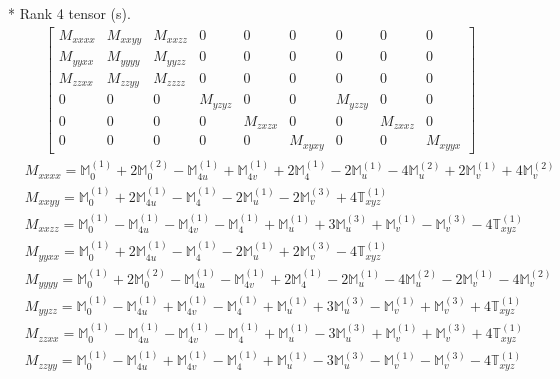 \documentclass[fleqn,8pt,landscape]{jsarticle}
\begin{document}
* Rank 4 tensor (s).
\begin{align*}
\begin{bmatrix} M_{xxxx} & M_{xxyy} & M_{xxzz} & 0 & 0 & 0 & 0 & 0 & 0 \\ M_{yyxx} & M_{yyyy} & M_{yyzz} & 0 & 0 & 0 & 0 & 0 & 0 \\ M_{zzxx} & M_{zzyy} & M_{zzzz} & 0 & 0 & 0 & 0 & 0 & 0 \\ 0 & 0 & 0 & M_{yzyz} & 0 & 0 & M_{yzzy} & 0 & 0 \\ 0 & 0 & 0 & 0 & M_{zxzx} & 0 & 0 & M_{zxxz} & 0 \\ 0 & 0 & 0 & 0 & 0 & M_{xyxy} & 0 & 0 & M_{xyyx} \end{bmatrix}
\end{align*}
\begin{align*}
& M_{xxxx} = \mathbb{M}_{0}^{(1)} + 2 \mathbb{M}_{0}^{(2)} - \mathbb{M}_{4u}^{(1)} + \mathbb{M}_{4v}^{(1)} + 2 \mathbb{M}_{4}^{(1)} - 2 \mathbb{M}_{u}^{(1)} - 4 \mathbb{M}_{u}^{(2)} + 2 \mathbb{M}_{v}^{(1)} + 4 \mathbb{M}_{v}^{(2)} \\
& M_{xxyy} = \mathbb{M}_{0}^{(1)} + 2 \mathbb{M}_{4u}^{(1)} - \mathbb{M}_{4}^{(1)} - 2 \mathbb{M}_{u}^{(1)} - 2 \mathbb{M}_{v}^{(3)} + 4 \mathbb{T}_{xyz}^{(1)} \\
& M_{xxzz} = \mathbb{M}_{0}^{(1)} - \mathbb{M}_{4u}^{(1)} - \mathbb{M}_{4v}^{(1)} - \mathbb{M}_{4}^{(1)} + \mathbb{M}_{u}^{(1)} + 3 \mathbb{M}_{u}^{(3)} + \mathbb{M}_{v}^{(1)} - \mathbb{M}_{v}^{(3)} - 4 \mathbb{T}_{xyz}^{(1)} \\
& M_{yyxx} = \mathbb{M}_{0}^{(1)} + 2 \mathbb{M}_{4u}^{(1)} - \mathbb{M}_{4}^{(1)} - 2 \mathbb{M}_{u}^{(1)} + 2 \mathbb{M}_{v}^{(3)} - 4 \mathbb{T}_{xyz}^{(1)} \\
& M_{yyyy} = \mathbb{M}_{0}^{(1)} + 2 \mathbb{M}_{0}^{(2)} - \mathbb{M}_{4u}^{(1)} - \mathbb{M}_{4v}^{(1)} + 2 \mathbb{M}_{4}^{(1)} - 2 \mathbb{M}_{u}^{(1)} - 4 \mathbb{M}_{u}^{(2)} - 2 \mathbb{M}_{v}^{(1)} - 4 \mathbb{M}_{v}^{(2)} \\
& M_{yyzz} = \mathbb{M}_{0}^{(1)} - \mathbb{M}_{4u}^{(1)} + \mathbb{M}_{4v}^{(1)} - \mathbb{M}_{4}^{(1)} + \mathbb{M}_{u}^{(1)} + 3 \mathbb{M}_{u}^{(3)} - \mathbb{M}_{v}^{(1)} + \mathbb{M}_{v}^{(3)} + 4 \mathbb{T}_{xyz}^{(1)} \\
& M_{zzxx} = \mathbb{M}_{0}^{(1)} - \mathbb{M}_{4u}^{(1)} - \mathbb{M}_{4v}^{(1)} - \mathbb{M}_{4}^{(1)} + \mathbb{M}_{u}^{(1)} - 3 \mathbb{M}_{u}^{(3)} + \mathbb{M}_{v}^{(1)} + \mathbb{M}_{v}^{(3)} + 4 \mathbb{T}_{xyz}^{(1)} \\
& M_{zzyy} = \mathbb{M}_{0}^{(1)} - \mathbb{M}_{4u}^{(1)} + \mathbb{M}_{4v}^{(1)} - \mathbb{M}_{4}^{(1)} + \mathbb{M}_{u}^{(1)} - 3 \mathbb{M}_{u}^{(3)} - \mathbb{M}_{v}^{(1)} - \mathbb{M}_{v}^{(3)} - 4 \mathbb{T}_{xyz}^{(1)} \\

\end{align*}
\end{document}
